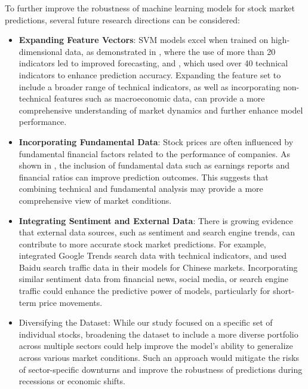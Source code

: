 \documentclass[aodsor,preprint]{imsart}
\numberwithin{equation}{section}
\theoremstyle{plain}
\begin{document}
To further improve the robustness of machine learning models for stock market predictions, several future research directions can be considered:

\begin{itemize}
    \item \textbf{Expanding Feature Vectors}: SVM models excel when trained on high-dimensional data, as demonstrated in \cite{pagliaro2023}, where the use of more than 20 indicators led to improved forecasting, and \cite{ampomah2020}, which used over 40 technical indicators to enhance prediction accuracy. Expanding the feature set to include a broader range of technical indicators, as well as incorporating non-technical features such as macroeconomic data, can provide a more comprehensive understanding of market dynamics and further enhance model performance.

    
    \item \textbf{Incorporating Fundamental Data}: Stock prices are often influenced by fundamental financial factors related to the performance of companies. As shown in \cite{ballings2015}, the inclusion of fundamental data such as earnings reports and financial ratios can improve prediction outcomes. This suggests that combining technical and fundamental analysis may provide a more comprehensive view of market conditions.
    
    \item \textbf{Integrating Sentiment and External Data}: There is growing evidence that external data sources, such as sentiment and search engine trends, can contribute to more accurate stock market predictions. For example, \cite{saetia2022} integrated Google Trends search data with technical indicators, and \cite{zhou2020} used Baidu search traffic data in their models for Chinese markets. Incorporating similar sentiment data from financial news, social media, or search engine traffic could enhance the predictive power of models, particularly for short-term price movements.
    
    \item Diversifying the Dataset: While our study focused on a specific set of individual stocks, broadening the dataset to include a more diverse portfolio across multiple sectors could help improve the model's ability to generalize across various market conditions. Such an approach would mitigate the risks of sector-specific downturns and improve the robustness of predictions during recessions or economic shifts.
\end{itemize}
\end{document}
